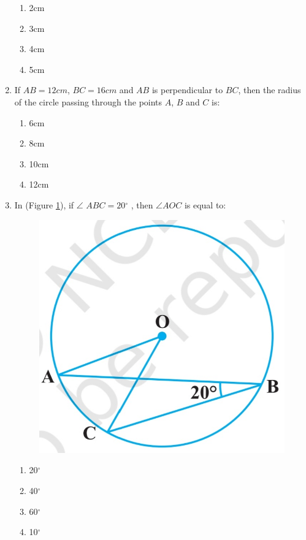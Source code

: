 \documentclass{article}
\begin{document}
\begin{enumerate}
\begin{enumerate}
\item 2cm
\item 3cm
\item 4cm
\item 5cm
\end{enumerate}
\item If $AB = 12 cm$, $BC = 16 cm$ and $AB$ is perpendicular to $BC$, then the radius of the circle passing through the points $A$, $B$ and $C$ is:
\begin{enumerate}
\item 6cm
\item 8cm
\item 10cm
\item 12cm
\end{enumerate}
\item In (Figure \ref{fig:10.4}), if $\angle$ $ABC = 20$$^{\circ}$ , then $\angle$$AOC$ is equal to: 
\begin{figure}[H]
\centering
\includegraphics[width=\columnwidth]{figs/10.4.jpg}
\caption{}
\label{fig:10.4}
\end{figure}
\begin{enumerate}
\item 20$^{\circ}$
\item 40$^{\circ}$
\item 60$^{\circ}$
\item 10$^{\circ}$

\end{enumerate}
\end{enumerate}
\end{document}
